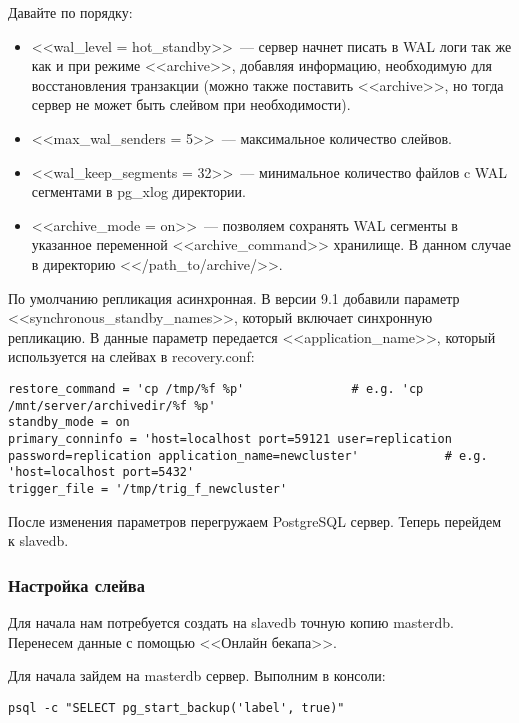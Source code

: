 Давайте по порядку:
\begin{itemize}
\item <<wal\_level = hot\_standby>>~--- сервер начнет писать в WAL логи так же как и при режиме <<archive>>, 
добавляя информацию, необходимую для восстановления транзакции (можно также поставить <<archive>>, 
но тогда сервер не может быть слейвом при необходимости).
\item <<max\_wal\_senders = 5>>~--- максимальное количество слейвов.
\item <<wal\_keep\_segments = 32>>~--- минимальное количество файлов c WAL сегментами в pg\_xlog директории.
\item <<archive\_mode = on>>~--- позволяем сохранять WAL сегменты в указанное переменной <<archive\_command>> хранилище. 
В данном случае в директорию <</path\_to/archive/>>.
\end{itemize}

По умолчанию репликация асинхронная. В версии 9.1 добавили параметр <<synchronous\_standby\_names>>, который включает синхронную репликацию. В данные параметр передается <<application\_name>>, который используется на слейвах в recovery.conf:

\begin{lstlisting}[label=lst:streaming91,caption=recovery.conf для синхронной репликации на слейве]
restore_command = 'cp /tmp/%f %p'               # e.g. 'cp /mnt/server/archivedir/%f %p'
standby_mode = on
primary_conninfo = 'host=localhost port=59121 user=replication password=replication application_name=newcluster'            # e.g. 'host=localhost port=5432'
trigger_file = '/tmp/trig_f_newcluster'
\end{lstlisting}


После изменения параметров перегружаем PostgreSQL сервер. Теперь перейдем к slavedb.

\subsubsection{Настройка слейва}
Для начала нам потребуется создать на slavedb точную копию masterdb. Перенесем данные с помощью <<Онлайн бекапа>>.

Для начала зайдем на masterdb сервер. Выполним в консоли:
\begin{lstlisting}[label=lst:streaming10,caption=Выполняем на мастере]
psql -c "SELECT pg_start_backup('label', true)" 
\end{lstlisting}

